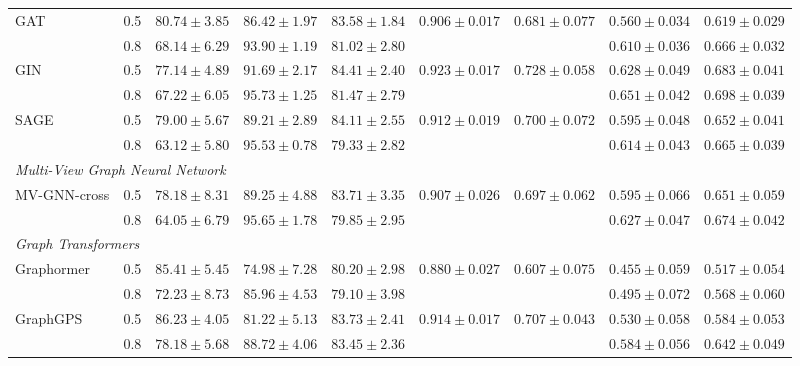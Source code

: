 \documentclass[letterpaper]{article}
\begin{document}
\begin{table}[t]
{\begin{tabular}{llccccccc}
\multirow{2}{*}{GAT} & 0.5 & $80.74 \pm 3.85$ & $86.42 \pm 1.97$ & $83.58 \pm 1.84$ & \multirow{2}{*}{$0.906 \pm 0.017$} & \multirow{2}{*}{$0.681 \pm 0.077$} & $0.560 \pm 0.034$ & $0.619 \pm 0.029$ \\
 & 0.8 & $68.14 \pm 6.29$ & $93.90 \pm 1.19$ & $81.02 \pm 2.80$ &  &  & $0.610 \pm 0.036$ & $0.666 \pm 0.032$ \\
\multirow{2}{*}{GIN} & 0.5 & $77.14 \pm 4.89$ & $91.69 \pm 2.17$ & $84.41 \pm 2.40$ & \multirow{2}{*}{$0.923 \pm 0.017$} & \multirow{2}{*}{$0.728 \pm 0.058$} & $0.628 \pm 0.049$ & $0.683 \pm 0.041$ \\
 & 0.8 & $67.22 \pm 6.05$ & $95.73 \pm 1.25$ & $81.47 \pm 2.79$ &  &  & \underline{$0.651 \pm 0.042$} & \underline{$0.698 \pm 0.039$} \\
\multirow{2}{*}{SAGE} & 0.5 & $79.00 \pm 5.67$ & $89.21 \pm 2.89$ & $84.11 \pm 2.55$ & \multirow{2}{*}{$0.912 \pm 0.019$} & \multirow{2}{*}{$0.700 \pm 0.072$} & $0.595 \pm 0.048$ & $0.652 \pm 0.041$ \\
 & 0.8 & $63.12 \pm 5.80$ & $95.53 \pm 0.78$ & $79.33 \pm 2.82$ &  &  & $0.614 \pm 0.043$ & $0.665 \pm 0.039$ \\
\midrule
\multicolumn{9}{l}{\textit{Multi-View Graph Neural Network}} \\
\midrule
\multirow{2}{*}{MV-GNN-cross} & 0.5 & $78.18 \pm 8.31$ & $89.25 \pm 4.88$ & $83.71 \pm 3.35$ & \multirow{2}{*}{$0.907 \pm 0.026$} & \multirow{2}{*}{$0.697 \pm 0.062$} & $0.595 \pm 0.066$ & $0.651 \pm 0.059$ \\
 & 0.8 & $64.05 \pm 6.79$ & $95.65 \pm 1.78$ & $79.85 \pm 2.95$ &  &  & $0.627 \pm 0.047$ & $0.674 \pm 0.042$ \\
\midrule
\multicolumn{9}{l}{\textit{Graph Transformers}} \\
\midrule
\multirow{2}{*}{Graphormer} & 0.5 & $85.41 \pm 5.45$ & $74.98 \pm 7.28$ & $80.20 \pm 2.98$ & \multirow{2}{*}{$0.880 \pm 0.027$} & \multirow{2}{*}{$0.607 \pm 0.075$} & $0.455 \pm 0.059$ & $0.517 \pm 0.054$ \\
 & 0.8 & $72.23 \pm 8.73$ & $85.96 \pm 4.53$ & $79.10 \pm 3.98$ &  &  & $0.495 \pm 0.072$ & $0.568 \pm 0.060$ \\
\multirow{2}{*}{GraphGPS} & 0.5 & \underline{$86.23 \pm 4.05$} & $81.22 \pm 5.13$ & $83.73 \pm 2.41$ & \multirow{2}{*}{$0.914 \pm 0.017$} & \multirow{2}{*}{$0.707 \pm 0.043$} & $0.530 \pm 0.058$ & $0.584 \pm 0.053$ \\
 & 0.8 & $78.18 \pm 5.68$ & $88.72 \pm 4.06$ & $83.45 \pm 2.36$ &  &  & $0.584 \pm 0.056$ & $0.642 \pm 0.049$ \\

\end{tabular}}
\end{table}
\end{document}
